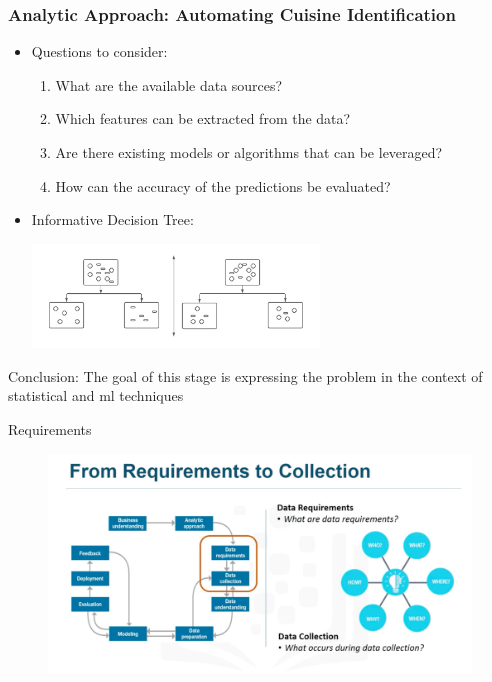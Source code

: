 \documentclass{beamer}
\begin{document}
\begin{frame}
	\frametitle{Analytic Approach: Automating Cuisine Identification}
	
	\begin{itemize}
			\item Questions to consider:
			\begin{enumerate}
				\item What are the available data sources?
				\item Which features can be extracted from the data?
				\item Are there existing models or algorithms that can be leveraged?
				\item How can the accuracy of the predictions be evaluated?
			\end{enumerate}
			\item Informative Decision Tree:
			\vspace{0.5cm}
			\begin{center}
				\includegraphics[width=0.6\textwidth]{informativetree.png}
			\end{center}
		\end{itemize}
	 Conclusion: The goal of this stage is expressing the problem in the context of statistical and ml techniques
\end{frame}






\begin{frame}{Requirements}
	\begin{figure}
		\includegraphics[width=\textwidth]{requirements.png}
	\end{figure}
\end{frame}
\end{document}
